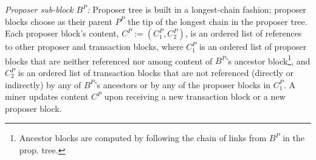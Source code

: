 \emph{Proposer sub-block $B^P$:} 
Proposer tree is built in a longest-chain fashion; proposer blocks choose as their parent $P^P$  the tip of the longest chain in the proposer tree. 
Each proposer block's content, $C^P  :=(C^P_1, C^P_2)$, is an ordered list of references to other proposer and transaction blocks, where
$C^P_1$ is an ordered list of proposer blocks that are neither referenced nor among content of $B^P$'s ancestor block\footnote{ Ancestor blocks are computed by following the chain of links from $B^P$ in the prop. tree.}, and
 $C^P_2$ is an ordered list of transaction blocks that are not referenced (directly or indirectly) by any of $B^P$'s ancestors or by any of the proposer blocks in $C^P_1$.
A miner updates content $C^P$ upon receiving a new transaction block or a new proposer block. 

